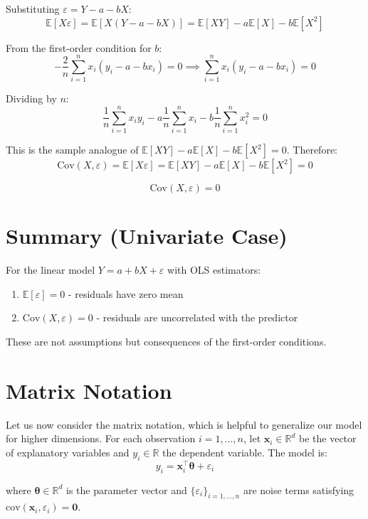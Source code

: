 \documentclass[main.tex]{subfiles}
\begin{document}
Substituting $\varepsilon = Y - a - bX$:
$$\mathbb{E}[X\varepsilon] = \mathbb{E}[X(Y - a - bX)] = \mathbb{E}[XY] - a\mathbb{E}[X] - b\mathbb{E}[X^2]$$

From the first-order condition for $b$:
$$-\frac{2}{n}\sum_{i=1}^{n}x_i(y_i - a - bx_i) = 0 \implies \sum_{i=1}^{n} x_i(y_i - a - bx_i) = 0$$

Dividing by $n$:
$$\frac{1}{n}\sum_{i=1}^{n} x_iy_i - a\frac{1}{n}\sum_{i=1}^{n}x_i - b\frac{1}{n}\sum_{i=1}^{n}x_i^2 = 0$$

This is the sample analogue of $\mathbb{E}[XY] - a\mathbb{E}[X] - b\mathbb{E}[X^2] = 0$. Therefore:
$$\text{Cov}(X, \varepsilon) = \mathbb{E}[X\varepsilon] = \mathbb{E}[XY] - a\mathbb{E}[X] - b\mathbb{E}[X^2] = 0$$

$$\boxed{\text{Cov}(X, \varepsilon) = 0}$$

\section{Summary (Univariate Case)}

For the linear model $Y = a + bX + \varepsilon$ with OLS estimators:

\begin{enumerate}
    \item $\mathbb{E}[\varepsilon] = 0$ - residuals have zero mean
    \item $\text{Cov}(X, \varepsilon) = 0$ - residuals are uncorrelated with the predictor
\end{enumerate}

These are not assumptions but consequences of the first-order conditions.

\needspace{0.33\textheight}
\section{Matrix Notation}

Let us now consider the matrix notation, which is helpful to generalize our model for higher dimensions. For each observation $i = 1, \ldots, n$, let $\mathbf{x}_i \in \mathbb{R}^d$ be the vector of explanatory variables and $y_i \in \mathbb{R}$ the dependent variable. The model is:
$$y_i = \mathbf{x}_i^\top \boldsymbol{\theta} + \varepsilon_i$$

where $\boldsymbol{\theta} \in \mathbb{R}^d$ is the parameter vector and $\{\varepsilon_i\}_{i=1,\ldots,n}$ are noise terms satisfying $\text{cov}(\mathbf{x}_i, \varepsilon_i) = \mathbf{0}$.
\end{document}
